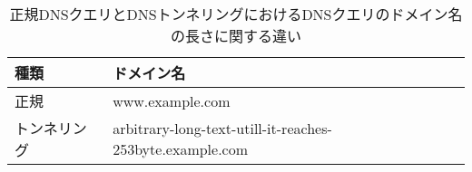 \begin{table}[h]
 \centering
  \begin{tabular}{l|l}
    \toprule
    \textbf{種類} & \textbf{ドメイン名} \\
    \midrule
    正規 &  www.example.com \\ \hline
    トンネリング & arbitrary-long-text-utill-it-reaches-253byte.example.com\\
    \bottomrule
  \end{tabular}
 \caption{正規DNSクエリとDNSトンネリングにおけるDNSクエリのドメイン名の長さに関する違い}
 \label{tab:feature-tunnel}
\end{table}

